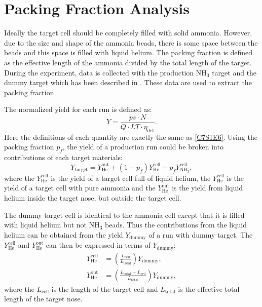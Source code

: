 \section{Packing Fraction Analysis}
\label{C7S3}

Ideally the target cell should be completely filled with solid ammonia. However, due to the size and shape of the ammonia beads, there is some space between the beads and this space is filled with liquid helium. The packing fraction is defined as the effective length of the ammonia divided by the total length of the target. During the experiment, data is collected with the production NH${}_3$ target and the dummy target which has been described in . These data are used to extract the packing fraction.

The normalized yield for each run is defined as:
\begin{equation} \label{C7S3E1}
Y = \frac{ps\cdot N}{Q\cdot LT\cdot \eta_{\mathrm{det}}}.
\end{equation}
Here the definitions of each quantity are exactly the same as \cref{C7S1E6}. Using the packing fraction $p_f$, the yield of a production run could be broken into contributions of each target materials:
\begin{equation} \label{C7S3E2}
Y_{\mathrm{target}} = Y_{\mathrm{He}}^{\mathrm{out}}+(1-p_f)Y_{\mathrm{He}}^{\mathrm{cell}}+p_fY_{\mathrm{NH_{3}}}^{\mathrm{cell}},
\end{equation}
where the $Y_{\mathrm{He}}^{\mathrm{cell}}$ is the yield of a target cell full of liquid helium, the $Y_{\mathrm{He}}^{\mathrm{cell}}$ is the yield of a target cell with pure ammonia and the $Y_{\mathrm{He}}^{\mathrm{out}}$ is the yield from liquid helium inside the target nose, but outside the target cell.

The dummy target cell is identical to the ammonia cell except that it is filled with liquid helium but not NH${}_3$ beads. Thus the contributions from the liquid helium can be obtained from the yield $Y_{\mathrm{dummy}}$ of a run with dummy target. The $Y_{\mathrm{He}}^{\mathrm{cell}}$ and $Y_{\mathrm{He}}^{\mathrm{out}}$ can then be expressed in terms of $Y_{\mathrm{dummy}}$:
\begin{align} \label{C7S3E3}
Y_{\mathrm{He}}^{\mathrm{cell}} & = \left(\frac{L_{\mathrm{cell}}}{L_{\mathrm{total}}}\right)Y_{\mathrm{dummy}}, \\ \label{C7S3E4}
Y_{\mathrm{He}}^{\mathrm{out}} & = \left(\frac{L_{\mathrm{total}}-L_{\mathrm{cell}}}{L_{\mathrm{total}}}\right)Y_{\mathrm{dummy}},
\end{align}
where the $L_{\mathrm{cell}}$ is the length of the target cell and $L_{\mathrm{total}}$ is the effective total length of the target nose.

